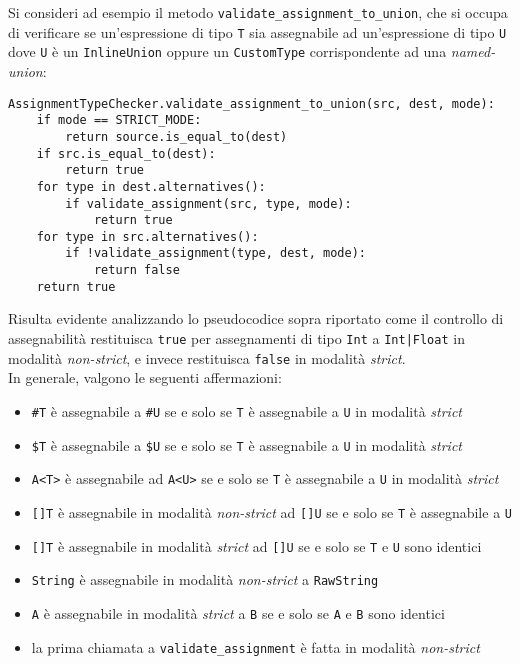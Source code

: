 \newpage

Si consideri ad esempio il metodo \texttt{validate\_assignment\_to\_union}, che si occupa di verificare
se un'espressione di tipo \texttt{T} sia assegnabile ad un'espressione di tipo \texttt{U} dove \texttt{U}
è un \texttt{InlineUnion} oppure un \texttt{CustomType} corrispondente ad una \textit{named-union}: \\

\vspace{0.5cm}
\begin{lstlisting}[frame=single]
AssignmentTypeChecker.validate_assignment_to_union(src, dest, mode):
    if mode == STRICT_MODE:
        return source.is_equal_to(dest)
    if src.is_equal_to(dest):
        return true
    for type in dest.alternatives():
        if validate_assignment(src, type, mode):
            return true
    for type in src.alternatives():
        if !validate_assignment(type, dest, mode):
            return false
    return true
\end{lstlisting}
\vspace{0.5cm}

Risulta evidente analizzando lo pseudocodice sopra riportato come il controllo di assegnabilità
restituisca \texttt{true} per assegnamenti di tipo \texttt{Int} a \texttt{Int|Float} in modalità \textit{non-strict}, 
e invece restituisca \texttt{false} in modalità \textit{strict}. \\

In generale, valgono le seguenti affermazioni:

\begin{itemize}
    \item \texttt{\#T} è assegnabile a \texttt{\#U} se e solo se \texttt{T} è assegnabile a \texttt{U} in modalità \textit{strict}
    \item \texttt{\$T} è assegnabile a \texttt{\$U} se e solo se \texttt{T} è assegnabile a \texttt{U} in modalità \textit{strict}
    \item \texttt{A<T>} è assegnabile ad \texttt{A<U>} se e solo se \texttt{T} è assegnabile a \texttt{U} in modalità \textit{strict}
    \item \texttt{[]T} è assegnabile in modalità \textit{non-strict} ad \texttt{[]U} se e solo se \texttt{T} è assegnabile a \texttt{U}
    \item \texttt{[]T} è assegnabile in modalità \textit{strict} ad \texttt{[]U} se e solo se \texttt{T} e \texttt{U} sono identici
    \item \texttt{String} è assegnabile in modalità \textit{non-strict} a \texttt{RawString}
    \item \texttt{A} è assegnabile in modalità \textit{strict} a \texttt{B} se e solo se \texttt{A} e \texttt{B} sono identici
    \item la prima chiamata a \texttt{validate\_assignment} è fatta in modalità \textit{non-strict}
\end{itemize}

